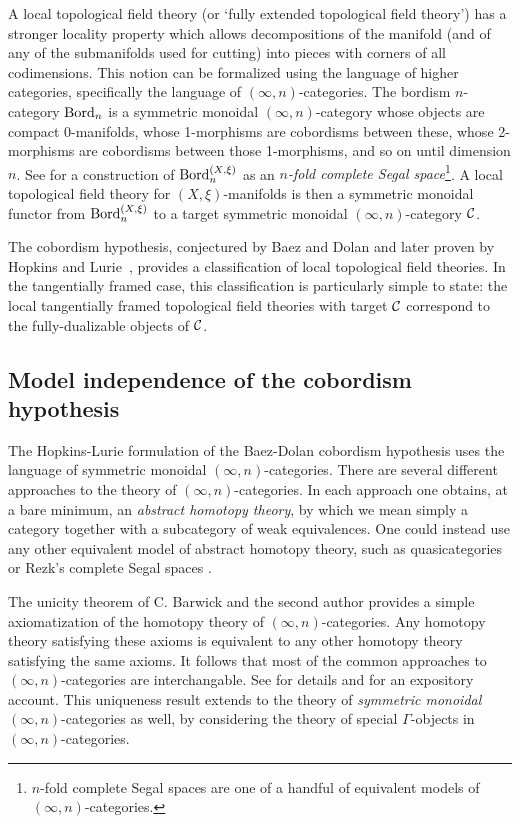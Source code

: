 \documentclass[a4paper]{amsart}
\begin{document}
A local topological field theory (or `fully extended topological field theory') has a stronger locality property which allows decompositions of the manifold (and of any of the submanifolds used for cutting) into pieces with corners of all codimensions. This notion can be formalized using the language of higher categories, specifically the language of $(\infty,n)$-categories. The bordism $n$-category $\mathrm{Bord}_n$ is a symmetric monoidal $(\infty,n)$-category whose objects are compact 0-manifolds, whose 1-morphisms are cobordisms between these, whose 2-morphisms are cobordisms between those 1-morphisms, and so on until dimension $n$. See \cite[\S 2.2]{lurie-ch} for a construction of $\mathrm{Bord}_n^{(X,\xi)}$ as an {\em $n$-fold complete Segal space}\footnote{$n$-fold complete Segal spaces are one of a handful of equivalent models of $(\infty,n)$-categories.}.
 A local topological field theory for $(X,\xi)$-manifolds is then a symmetric monoidal functor from $\mathrm{Bord}_n^{(X,\xi)}$ to a target symmetric monoidal $(\infty,n)$-category $\mathcal C$. 

The cobordism hypothesis, conjectured by Baez and Dolan \cite{MR1355899} and later proven by Hopkins and Lurie~\cite{lurie-ch}, provides a classification of local topological field theories.  In the tangentially framed case, this classification is particularly simple to state: the local tangentially framed topological field theories with target $\mathcal C$ correspond to the fully-dualizable objects of $\mathcal C$.


\subsection{Model independence of the cobordism hypothesis} \label{app:modelindep}

The Hopkins-Lurie formulation of the Baez-Dolan cobordism hypothesis uses the language of symmetric monoidal $(\infty,n)$-categories. There are several different approaches to the theory of $(\infty,n)$-categories. In each approach one obtains, at a bare minimum, an {\em abstract homotopy theory}, by which we mean simply a category together with a subcategory of weak equivalences.  One could instead use any other equivalent model of abstract homotopy theory, such as quasicategories \cite{Joyal_quasicats} or Rezk's complete Segal spaces \cite{Rezk_complete_Segal_Spaces}. 


The unicity theorem of C. Barwick and the second author \cite{Barwick-SP} provides a simple axiomatization of the homotopy theory of $(\infty,n)$-categories. Any homotopy theory satisfying these axioms is equivalent to any other homotopy theory satisfying the same axioms. It follows that most of the common approaches to $(\infty, n)$-categories are interchangable. See \cite{Barwick-SP} for details and \cite{SP_DLHC_Lectures} for an expository account. This uniqueness result extends to the theory of {\em symmetric monoidal} $(\infty, n)$-categories as well, by considering the theory of special $\Gamma$-objects in $(\infty,n)$-categories. 
\end{document}
